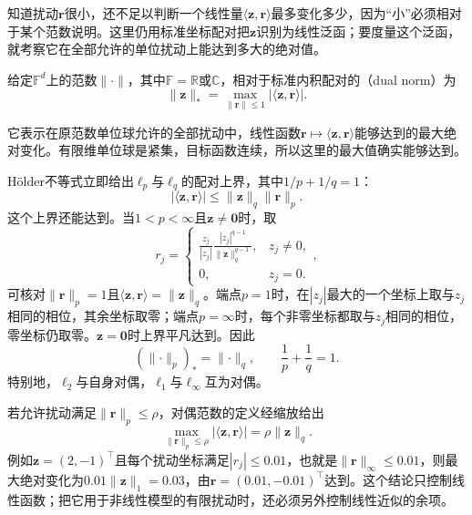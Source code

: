 知道扰动$\bm{r}$很小，还不足以判断一个线性量$\langle\bm{z},\bm{r}\rangle$最多变化多少，因为“小”必须相对于某个范数说明。这里仍用标准坐标配对把$\bm{z}$识别为线性泛函；要度量这个泛函，就考察它在全部允许的单位扰动上能达到多大的绝对值。

\begin{definition}[有限维对偶范数]
\label{def:linear-algebra-dual-norm}
给定$\mathbb{F}^d$上的范数$\lVert\cdot\rVert$，其中$\mathbb{F}=\mathbb{R}$或$\mathbb{C}$，相对于标准内积配对的（dual norm）为
\begin{equation}
  \lVert\bm{z}\rVert_{*} = \max_{\lVert\bm{r}\rVert\leq1} |\langle\bm{z},\bm{r}\rangle|. \label{eq:linear-algebra-dual-norm-definition}
\end{equation}
\end{definition}
它表示在原范数单位球允许的全部扰动中，线性函数$\bm{r}\mapsto\langle\bm{z},\bm{r}\rangle$能够达到的最大绝对变化。有限维单位球是紧集，目标函数连续，所以这里的最大值确实能够达到。

Hölder不等式立即给出$\ell_p$与$\ell_q$的配对上界，其中$1/p+1/q=1$：
\[
  |\langle\bm{z},\bm{r}\rangle|
  \leq
  \lVert\bm{z}\rVert_q\lVert\bm{r}\rVert_p.
\]
这个上界还能达到。当$1<p<\infty$且$\bm{z}\neq\bm{0}$时，取
\[
  r_j
  =
  \begin{cases}
    \displaystyle
    \frac{z_j}{|z_j|}
    \frac{|z_j|^{q-1}}{\lVert\bm{z}\rVert_q^{q-1}},
    & z_j\neq0,\\[6pt]
    0,
    & z_j=0.
  \end{cases},
\]
可核对$\lVert\bm{r}\rVert_p=1$且$\langle\bm{z},\bm{r}\rangle=\lVert\bm{z}\rVert_q$。端点$p=1$时，在$|z_j|$最大的一个坐标上取与$z_j$相同的相位，其余坐标取零；端点$p=\infty$时，每个非零坐标都取与$z_j$相同的相位，零坐标仍取零。$\bm{z}=\bm{0}$时上界平凡达到。因此
\begin{equation}
  (\lVert\cdot\rVert_p)_{*} = \lVert\cdot\rVert_q, \qquad \frac{1}{p}+\frac{1}{q}=1. \label{eq:linear-algebra-lp-duality}
\end{equation}
特别地，$\ell_2$与自身对偶，$\ell_1$与$\ell_{\infty}$互为对偶。

若允许扰动满足$\lVert\bm{r}\rVert_p\leq\rho$，对偶范数的定义经缩放给出
\begin{equation}
  \max_{\lVert\bm{r}\rVert_p\leq\rho} |\langle\bm{z},\bm{r}\rangle| = \rho\lVert\bm{z}\rVert_q. \label{eq:linear-algebra-linear-perturbation-duality}
\end{equation}
例如$\bm{z}=(2,-1)^{\top}$且每个扰动坐标满足$|r_j|\leq0.01$，也就是$\lVert\bm{r}\rVert_{\infty}\leq0.01$，则最大绝对变化为$0.01\lVert\bm{z}\rVert_1=0.03$，由$\bm{r}=(0.01,-0.01)^{\top}$达到。这个结论只控制线性函数；把它用于非线性模型的有限扰动时，还必须另外控制线性近似的余项。

